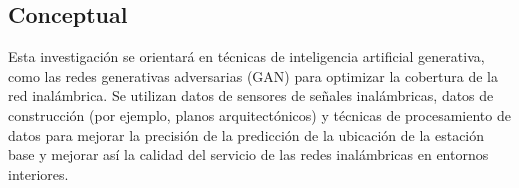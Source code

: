 \subsection{Conceptual}
Esta investigación se orientará en técnicas de inteligencia artificial generativa, como las redes generativas adversarias (GAN) para optimizar la cobertura de la red inalámbrica. Se utilizan datos de sensores de señales inalámbricas, datos de construcción (por ejemplo, planos arquitectónicos) y técnicas de procesamiento de datos para mejorar la precisión de la predicción de la ubicación de la estación base y mejorar así la calidad del servicio de las redes inalámbricas en entornos interiores.